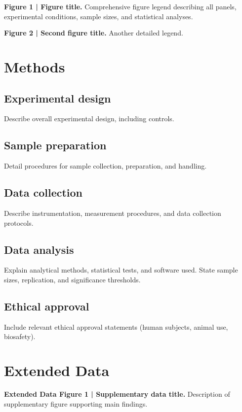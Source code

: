 \documentclass[12pt]{article}
\begin{document}
\textbf{Figure 1 | Figure title.} Comprehensive figure legend describing all panels, experimental conditions, sample sizes, and statistical analyses.

\textbf{Figure 2 | Second figure title.} Another detailed legend.

\section*{Methods}

\subsection*{Experimental design}
Describe overall experimental design, including controls.

\subsection*{Sample preparation}
Detail procedures for sample collection, preparation, and handling.

\subsection*{Data collection}
Describe instrumentation, measurement procedures, and data collection protocols.

\subsection*{Data analysis}
Explain analytical methods, statistical tests, and software used. State sample sizes, replication, and significance thresholds.

\subsection*{Ethical approval}
Include relevant ethical approval statements (human subjects, animal use, biosafety).

\section*{Extended Data}

\textbf{Extended Data Figure 1 | Supplementary data title.} Description of supplementary figure supporting main findings.
\end{document}
